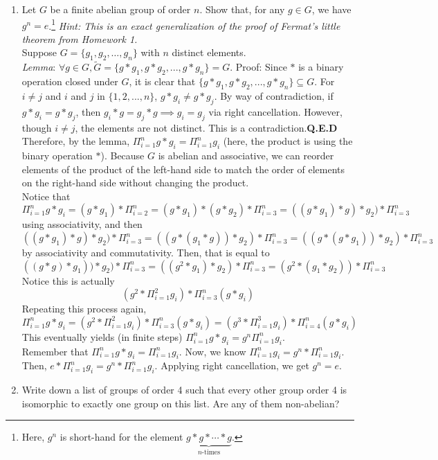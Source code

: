 \documentclass{amsart}
\begin{document}
\begin{enumerate}[itemsep=0.4in]
\item Let $G$ be a finite abelian group of order $n$. Show that, for any $g\in G$, we have $g^n = e$.\footnote{Here, $g^n$ is short-hand for the element $\underbrace{g*g*\cdots*g}_{n\text{-times}}$.} \emph{Hint: This is an exact generalization of the proof of Fermat's little theorem from Homework 1.}\\

Suppose $G=\{g_1,g_2,\dots,g_n\}$ with $n$ distinct elements. \\

\emph{Lemma}: $\forall g\in G,\tilde G=\{g*g_1,g*g_2,...,g*g_n\}=G$.
Proof: Since $*$ is a binary operation closed under $G$, it is clear that $\{g*g_1,g*g_2,...,g*g_n\}\subseteq G$. For $i\neq j$ and $i$ and $j$ in $\{1,2,...,n\}$, $g*g_i\neq g*g_j$. By way of contradiction, if $g*g_i=g*g_j$, then $g_i*g=g_j*g\implies g_i=g_j$ via right cancellation. However, though $i\neq j$, the elements are not distinct. This is a contradiction.\textbf{Q.E.D}\\

Therefore, by the lemma, $\Pi_{i=1}^ng*g_i=\Pi_{i=1}^ng_i$ (here, the product is using the binary operation $*$). Because $G$ is abelian and associative, we can reorder elements of the product of the left-hand side to match the order of elements on the right-hand side without changing the product.\\

Notice that $$\Pi_{i=1}^ng*g_i=(g*g_1)*\Pi_{i=2}^n=(g*g_1)*(g*g_2)*\Pi_{i=3}^n=((g*g_1)*g)*g_2)*\Pi_{i=3}^n$$ using associativity, and then $$((g*g_1)*g)*g_2)*\Pi_{i=3}^n=((g*(g_1*g))*g_2)*\Pi_{i=3}^n=((g*(g*g_1))*g_2)*\Pi_{i=3}^n$$ by associativity and commutativity.
Then, that is equal to $$((g*g)*g_1))*g_2)*\Pi_{i=3}^n=((g^2*g_1)*g_2)*\Pi_{i=3}^n=(g^2*(g_1*g_2))*\Pi_{i=3}^n$$
Notice this is actually $$(g^2*\Pi_{i=1}^2g_i)*\Pi_{i=3}^n(g*g_i)$$
Repeating this process again, $$\Pi_{i=1}^ng*g_i=(g^2*\Pi_{i=1}^2g_i)*\Pi_{i=3}^n(g*g_i)=(g^3*\Pi_{i=1}^3g_i)*\Pi_{i=4}^n(g*g_i)$$
This eventually yields (in finite steps) $\Pi_{i=1}^ng*g_i=g^n\Pi_{i=1}^ng_i$.\\

Remember that $\Pi_{i=1}^ng*g_i=\Pi_{i=1}^ng_i$. Now, we know $\Pi_{i=1}^ng_i=g^n*\Pi_{i=1}^ng_i$. Then, $e*\Pi_{i=1}^ng_i=g^n*\Pi_{i=1}^ng_i$. Applying right cancellation, we get $g^n=e$. 


\item Write down a list of groups of order 4 such that every other group order 4 is isomorphic to exactly one group on this list. Are any of them non-abelian?\\


\end{enumerate}
\end{document}
